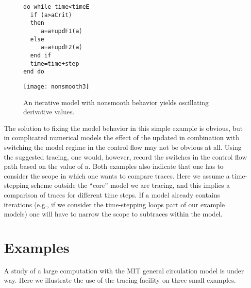 \documentclass{article}
\begin{document}
\begin{figure}
\begin{minipage}{.48\textwidth}
\begin{lstlisting}[frame=single,numbers=none,xleftmargin=0ex]
do while time<timeE
  if (a>aCrit) 
  then
     a=a+updF1(a)
  else 	
     a=a+updF2(a)
  end if
  time=time+step
end do  
\end{lstlisting}
\end{minipage}
\hfill
\begin{minipage}{.4\textwidth}
\texttt{[image: nonsmooth3]}
\end{minipage}
\caption{An iterative model with nonsmooth behavior yields 
oscillating derivative values.}\label{fig:oscillatingExample} 
\end{figure}
The solution to fixing the model behavior in this simple example is obvious,
but in complicated numerical models the effect of the updated in combination with 
switching the model regime in the control flow may not be obvious at all. 
Using the suggested tracing, one would, however, record the switches in 
the control flow path based on the value of a. 
Both examples also indicate that one has to consider the  scope in which 
one wants to compare traces. Here we assume a time-stepping scheme 
outside the ``core'' model we are tracing, and this implies a comparison 
of traces for different time steps.  
If a model already contains iterations (e.g., if we consider the time-stepping 
loops part of our example models) one will have to narrow the scope to 
subtraces within the model. 

\section{Examples}
A study of a large computation with  the MIT general circulation model 
is under way.  
Here we illustrate the use of the tracing facility on three small examples.
\end{document}
